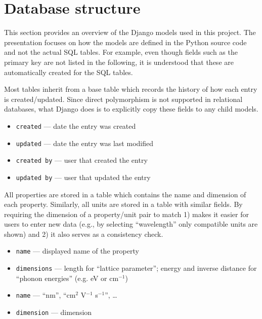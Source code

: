 \documentclass{article}
\begin{document}
\section{Database structure}

This section provides an overview of the Django models used in this project. The presentation focuses on how the models are defined in the Python source code and not the actual SQL tables. For example, even though fields such as the primary key are not listed in the following, it is understood that these are automatically created for the SQL tables.

Most tables inherit from a base table which records the history of how each entry is created/updated. Since direct polymorphism is not supported in relational databases, what Django does is to explicitly copy these fields to any child models.
\begin{tcolorbox}[colback=green!5,colframe=green!40!black,title=Base]
  \begin{itemize}
  \item \texttt{created} --- date the entry was created
  \item \texttt{updated} --- date the entry was last modified
  \item \texttt{created by} --- user that created the entry
  \item \texttt{updated by} --- user that updated the entry
  \end{itemize}
\end{tcolorbox}

All properties are stored in a table which contains the name and dimension of each property. Similarly, all units are stored in a table with similar fields. By requiring the dimension of a property/unit pair to match 1) makes it easier for users to enter new data (e.g., by selecting ``wavelength'' only compatible units are shown) and 2) it also serves as a consistency check.
\begin{tcolorbox}[colback=green!5,colframe=green!40!black,title=Property(Base)]
  \begin{itemize}
  \item \texttt{name} --- displayed name of the property
  \item \texttt{dimensions} --- length for ``lattice parameter''; energy and inverse distance for ``phonon energies'' (e.g. eV or cm$^{-1}$)
  \end{itemize}
\end{tcolorbox}

\begin{tcolorbox}[colback=green!5,colframe=green!40!black,title=Unit(Base)]
  \begin{itemize}
  \item \texttt{name} --- ``nm'', ``cm$^2$ V$^{-1}$ s$^{-1}$'', \ldots
  \item \texttt{dimension} --- dimension
  \end{itemize}
\end{tcolorbox}
\end{document}

